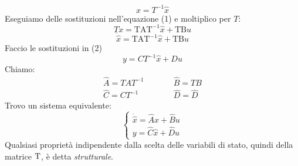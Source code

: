 	\begin{equation*}
		\boxed{x = T^{-1}\hat{x}}
	\end{equation*}
	Eseguiamo delle sostituzioni nell'equazione (1) e moltiplico per $ T $:
	\[
	T\dot{x} = \text{TAT}^{-1}\hat{x}+\text{TB}u
	\]
	\[
	\boxed{\dot{\hat{x}} = \text{TAT}^{-1}\hat{x}+\text{TB}u}
	\]
	Faccio le sostituzioni in (2)
	\[y = CT^{-1}\hat{x}+ Du\]
	Chiamo:
	\begin{align*}
		\hat{A} = TAT^{-1}& \qquad &\hat{B} = TB\\
		\hat{C} = CT^{-1}& \qquad &\hat{D} = \hat{D}
	\end{align*}
	Trovo un sistema equivalente:
	\begin{equation*}
		\begin{cases*}
			\dot{\hat{x}} = \hat{A}\hat{x}+\hat{B}u\\
			y = \hat{C}\hat{x} + \hat{D}u
		\end{cases*}
	\end{equation*}
	Qualsiasi proprietà indipendente dalla scelta delle variabili di stato, quindi della matrice $ \text T $, è detta \emph{strutturale}.


